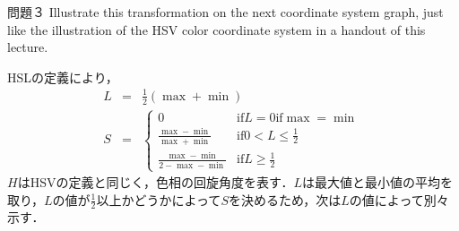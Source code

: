 \documentclass[a4paper,11pt]{jsarticle}
\numberwithin{theorem}{section}  %
\numberwithin{equation}{section} %
\begin{document}
\newpage
\begin{itembox}[l]{問題３}
Illustrate this transformation on the next coordinate system graph, just like the illustration of the HSV color coordinate system in a handout of this lecture.
\end{itembox}
HSLの定義により，
\begin{eqnarray*}
L &=& \frac{1}{2}(\max+\min) \\
S &=& \begin{cases}
0 & \text{if} L = 0 \text{if} \max = \min\\
\frac{\max-\min}{\max+\min} & \text{if} 0<L\le\frac{1}{2}\\
\frac{\max-\min}{2-\max-\min} & \text{if} L\ge \frac{1}{2}
\end{cases}
\end{eqnarray*}
$H$はHSVの定義と同じく，色相の回旋角度を表す．$L$は最大値と最小値の平均を取り，$L$の値が$\frac{1}{2}$以上かどうかによって$S$を決めるため，次は$L$の値によって別々示す．
\end{document}
